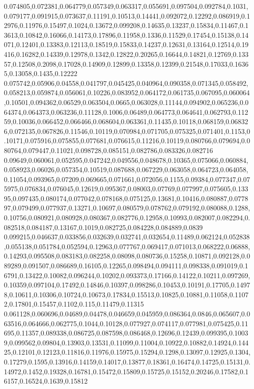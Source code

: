 0.074805,0.072381,0.064779,0.057349,0.063317,0.055691,0.097504,0.092784,0.1031,0.079177,0.091915,0.073637,0.11191,0.10513,0.14441,0.092072,0.12292,0.086919,0.12976,0.11976,0.15497,0.1024,0.13672,0.099208,0.14635,0.13237,0.15834,0.11467,0.13613,0.10842,0.16066,0.14173,0.17896,0.11958,0.1336,0.11529,0.17454,0.15138,0.14071,0.12401,0.13383,0.12113,0.18519,0.15833,0.14237,0.12631,0.13164,0.12514,0.19416,0.16282,0.14339,0.12978,0.1342,0.12822,0.20265,0.16644,0.14821,0.12769,0.13357,0.12508,0.2098,0.17028,0.14909,0.12899,0.13358,0.12399,0.21548,0.17033,0.16365,0.13058,0.1435,0.12222
0.075742,0.05906,0.04558,0.041797,0.045425,0.040964,0.090358,0.071345,0.058492,0.058213,0.059874,0.056061,0.10226,0.083952,0.064172,0.061735,0.067095,0.060064,0.10501,0.094362,0.06529,0.063504,0.0665,0.063028,0.11144,0.094902,0.065236,0.064374,0.064373,0.063236,0.11128,0.1006,0.06489,0.064773,0.064641,0.062793,0.11259,0.10036,0.066452,0.066466,0.068604,0.063361,0.11435,0.10118,0.068159,0.068326,0.072135,0.067826,0.11546,0.10119,0.070984,0.071705,0.075325,0.071401,0.1153,0.10171,0.075916,0.075855,0.077681,0.076615,0.11216,0.10119,0.080766,0.079694,0.080764,0.079447,0.11021,0.098728,0.085151,0.082786,0.083326,0.082716
0.09649,0.060061,0.052595,0.047242,0.049556,0.048678,0.10365,0.075066,0.060884,0.058923,0.06026,0.057354,0.10519,0.087688,0.067229,0.063058,0.064723,0.064058,0.11054,0.093965,0.07209,0.069665,0.071661,0.072056,0.1155,0.09384,0.077347,0.075975,0.076834,0.076045,0.12619,0.095367,0.08003,0.07769,0.077997,0.075605,0.13395,0.097435,0.080174,0.077042,0.078168,0.075125,0.13681,0.10416,0.080887,0.077897,0.079499,0.077937,0.13271,0.10697,0.080579,0.078762,0.079192,0.080088,0.1288,0.10756,0.080921,0.080928,0.080367,0.082776,0.12958,0.10993,0.082007,0.082294,0.082518,0.084187,0.13167,0.1019,0.082725,0.084228,0.084889,0.0839
0.099215,0.046637,0.033856,0.032639,0.032741,0.032654,0.11489,0.062124,0.052838,0.055138,0.051784,0.052594,0.12963,0.077767,0.069417,0.071013,0.068222,0.06888,0.14293,0.095508,0.083183,0.082258,0.08098,0.080736,0.15258,0.10871,0.092128,0.089289,0.091507,0.086689,0.16105,0.12265,0.098494,0.094111,0.098338,0.091019,0.16791,0.13422,0.10082,0.096244,0.10202,0.093373,0.17166,0.14122,0.10211,0.097269,0.10359,0.097104,0.17492,0.14846,0.10397,0.098286,0.10453,0.10191,0.17705,0.14978,0.10611,0.10306,0.10724,0.10673,0.17834,0.15513,0.10825,0.10881,0.11058,0.11072,0.17801,0.15457,0.1102,0.115,0.11479,0.11315
0.061128,0.060696,0.04689,0.04478,0.046659,0.045959,0.086364,0.0846,0.065607,0.063516,0.064666,0.062775,0.1044,0.10128,0.077927,0.074117,0.077981,0.075425,0.11695,0.11357,0.089338,0.086725,0.087598,0.086468,0.12696,0.12439,0.099395,0.10039,0.099562,0.09804,0.13903,0.13531,0.11099,0.11004,0.10922,0.10882,0.14924,0.14425,0.12101,0.12123,0.11816,0.11976,0.15975,0.15294,0.1298,0.13097,0.12925,0.1304,0.17279,0.1595,0.13916,0.14159,0.14017,0.13877,0.18361,0.16474,0.14725,0.15131,0.14972,0.1452,0.19328,0.16781,0.15472,0.15809,0.15725,0.15152,0.20246,0.17582,0.16157,0.16524,0.1639,0.15812
